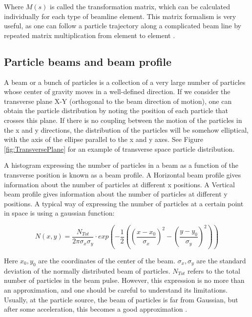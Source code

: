 Where $M(s)$ is called the transformation matrix, which can be calculated individually for each type of beamline element. This matrix formalism is very useful, as one can follow a particle trajectory along a complicated beam line by repeated matrix multiplication from element to element \parencite*[][]{ref:MatrixTransport}.

\subsection{Particle beams and beam profile}
\label{subsec:TransBeamProf}

A beam or a bunch of particles is a collection of a very large number of particles whose center of gravity moves in a well-defined direction. If we consider the transverse plane X-Y (orthogonal to the beam direction of motion), one can obtain the particle distribution by noting the position of each particle that crosses this plane. If there is no coupling between the motion of the particles in the x and y directions, the distribution of the particles will be somehow elliptical, with the axis of the ellipse parallel to the x and y axes. See Figure \ref{fig:TransversePlane} for an example of transverse space particle distribution. 

A histogram expressing the number of particles in a beam as a function of the transverse position is known as a beam profile. A Horizontal beam profile gives information about the number of particles at different x positions. A Vertical beam profile gives information about the number of particles at different y positions. A typical way of expressing the number of particles at a certain point in space is using a gaussian function:

\begin{equation}
    N(x,y) = \frac{N_{Tot}}{2\pi\sigma_x \sigma_y}\cdot exp\left(-\frac{1}{2}\left(\left(\frac{x-x_0}{\sigma_x}\right)^2 -\left(\frac{y-y_0}{\sigma_y}\right)^2\right)\right)
    \label{eq:GaussianDist}
\end{equation}

Here $x_0 , y_0$ are the coordinates of the center of the beam. $\sigma_x , \sigma_y$ are the standard deviation of the normally distributed beam of particles. $N_{Tot}$ refers to the total number of particles in the beam pulse. However, this expression is no more than an approximation, and one should be careful to understand its limitations. Usually, at the particle source, the beam of particles is far from Gaussian, but after some acceleration, this becomes a good approximation \parencite*[][]{ref:BookAccPhysics}.


